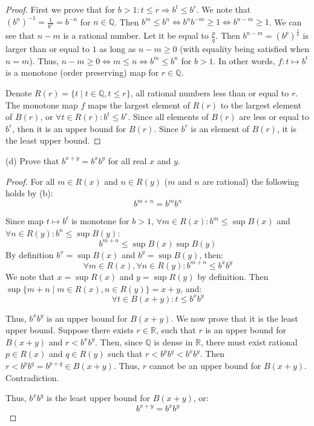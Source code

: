 \documentclass{article}
\begin{document}
\begin{proof}
First we prove that for $b>1 : t \leq r \Rightarrow b^t \leq b^r$. We note that $(b^n)^{-1} = \frac{1}{b^n} = b^{-n}$ for $n \in \mathbb{Q}$. Then $b^m \leq b^n \iff b^n b^{-m} \geq 1 \iff b^{n-m} \geq 1$. We can see that $n-m$ is a rational number. Let it be equal to $\frac{p}{q}$. Then $b^{n-m} = (b^p)^{\frac{1}{q}}$ is larger than or equal to $1$ as long as $n-m \geq 0$ (with equality being satisfied when $n=m$). Thus, $n-m \geq 0 \iff m \leq n \iff b^m \leq b^n$ for $b>1$. In other words, $f: t \mapsto b^t$ is a monotone (order preserving) map for $r \in \mathbb{Q}$.

Denote $R(r) = \{t \mid t \in \mathbb{Q}, t \leq r \}$, all rational numbers less than or equal to $r$. The monotone map $f$ maps the largest element of $R(r)$ to the largest element of $B(r)$, or $\forall t \in R(r): b^t \leq b^r$. Since all elements of $B(r)$ are less or equal to $b^r$, then it is an upper bound for $B(r)$. Since $b^r$ is an element of $B(r)$, it is the least upper bound.

\end{proof}

\begin{tcolorbox}
(d) Prove that $b^{x+y} = b^x b^y$ for all real $x$ and $y$.
\end{tcolorbox}

\begin{proof}
For all $m \in R(x)$ and $n \in R(y)$ ($m$ and $n$ are rational) the following holds by (b):
$$b^{m+n} = b^m b^n$$

Since map $t \mapsto b^t$ is monotone for $b>1$, $\forall m \in R(x) : b^m \leq \sup B(x)$ and $\forall n \in R(y) : b^n \leq \sup B(y)$:
$$b^{m+n} \leq \sup B(x) \sup B(y)$$
By definition $b^x = \sup B(x)$ and $b^y = \sup B(y)$, then:
$$\forall m \in R(x), \forall n \in R(y) : b^{m+n} \leq b^x b^y$$
We note that $x = \sup R(x)$ and $y = \sup R(y)$ by definition. Then $\sup \{ m+n \mid m \in R(x), n \in R(y)\} = x+y$, and:
$$\forall t \in B(x+y): t \leq b^x b^y$$

Thus, $b^x b^y$ is an upper bound for $B(x+y)$. We now prove that it is the least upper bound. Suppose there exists $r \in \mathbb{R}$, such that $r$ is an upper bound for $B(x+y)$ and $r < b^x b^y$. Then, since $\mathbb{Q}$ is dense in $\mathbb{R}$, there must exist rational $p \in R(x)$ and $q \in R(y)$ such that $r < b^p b^q < b^x b^y$. Then $r < b^p b^q = b^{p+q} \in B(x+y)$. Thus, $r$ cannot be an upper bound for $B(x+y)$. Contradiction.

Thus, $b^x b^y$ is the least upper bound for $B(x+y)$, or:
$$b^{x+y} = b^x b^y$$

\end{proof}
\end{document}
